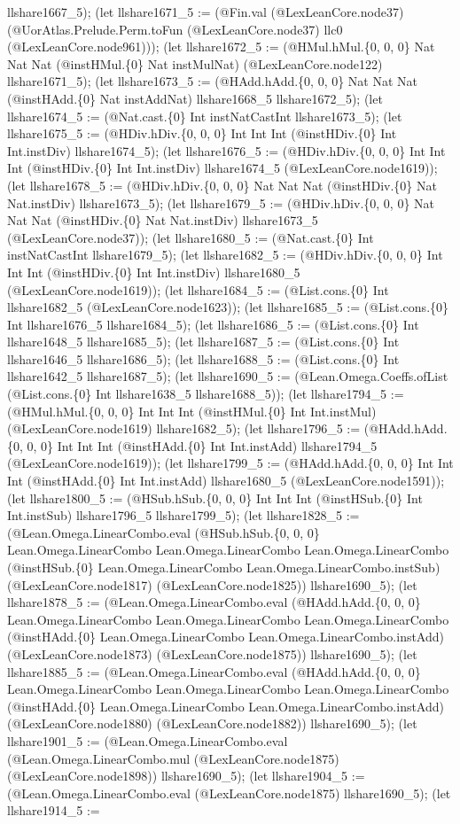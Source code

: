 \documentclass[11pt]{article}
\begin{document}
llshare1667\_5); (let llshare1671\_5 := (@Fin.val (@LexLeanCore.node37) (@UorAtlas.Prelude.Perm.toFun (@LexLeanCore.node37) llc0 (@LexLeanCore.node961))); (let llshare1672\_5 := (@HMul.hMul.\{0, 0, 0\} Nat Nat Nat (@instHMul.\{0\} Nat instMulNat) (@LexLeanCore.node122) llshare1671\_5); (let llshare1673\_5 := (@HAdd.hAdd.\{0, 0, 0\} Nat Nat Nat (@instHAdd.\{0\} Nat instAddNat) llshare1668\_5 llshare1672\_5); (let llshare1674\_5 := (@Nat.cast.\{0\} Int instNatCastInt llshare1673\_5); (let llshare1675\_5 := (@HDiv.hDiv.\{0, 0, 0\} Int Int Int (@instHDiv.\{0\} Int Int.instDiv) llshare1674\_5); (let llshare1676\_5 := (@HDiv.hDiv.\{0, 0, 0\} Int Int Int (@instHDiv.\{0\} Int Int.instDiv) llshare1674\_5 (@LexLeanCore.node1619)); (let llshare1678\_5 := (@HDiv.hDiv.\{0, 0, 0\} Nat Nat Nat (@instHDiv.\{0\} Nat Nat.instDiv) llshare1673\_5); (let llshare1679\_5 := (@HDiv.hDiv.\{0, 0, 0\} Nat Nat Nat (@instHDiv.\{0\} Nat Nat.instDiv) llshare1673\_5 (@LexLeanCore.node37)); (let llshare1680\_5 := (@Nat.cast.\{0\} Int instNatCastInt llshare1679\_5); (let llshare1682\_5 := (@HDiv.hDiv.\{0, 0, 0\} Int Int Int (@instHDiv.\{0\} Int Int.instDiv) llshare1680\_5 (@LexLeanCore.node1619)); (let llshare1684\_5 := (@List.cons.\{0\} Int llshare1682\_5 (@LexLeanCore.node1623)); (let llshare1685\_5 := (@List.cons.\{0\} Int llshare1676\_5 llshare1684\_5); (let llshare1686\_5 := (@List.cons.\{0\} Int llshare1648\_5 llshare1685\_5); (let llshare1687\_5 := (@List.cons.\{0\} Int llshare1646\_5 llshare1686\_5); (let llshare1688\_5 := (@List.cons.\{0\} Int llshare1642\_5 llshare1687\_5); (let llshare1690\_5 := (@Lean.Omega.Coeffs.ofList (@List.cons.\{0\} Int llshare1638\_5 llshare1688\_5)); (let llshare1794\_5 := (@HMul.hMul.\{0, 0, 0\} Int Int Int (@instHMul.\{0\} Int Int.instMul) (@LexLeanCore.node1619) llshare1682\_5); (let llshare1796\_5 := (@HAdd.hAdd.\{0, 0, 0\} Int Int Int (@instHAdd.\{0\} Int Int.instAdd) llshare1794\_5 (@LexLeanCore.node1619)); (let llshare1799\_5 := (@HAdd.hAdd.\{0, 0, 0\} Int Int Int (@instHAdd.\{0\} Int Int.instAdd) llshare1680\_5 (@LexLeanCore.node1591)); (let llshare1800\_5 := (@HSub.hSub.\{0, 0, 0\} Int Int Int (@instHSub.\{0\} Int Int.instSub) llshare1796\_5 llshare1799\_5); (let llshare1828\_5 := (@Lean.Omega.LinearCombo.eval (@HSub.hSub.\{0, 0, 0\} Lean.Omega.LinearCombo Lean.Omega.LinearCombo Lean.Omega.LinearCombo (@instHSub.\{0\} Lean.Omega.LinearCombo Lean.Omega.LinearCombo.instSub) (@LexLeanCore.node1817) (@LexLeanCore.node1825)) llshare1690\_5); (let llshare1878\_5 := (@Lean.Omega.LinearCombo.eval (@HAdd.hAdd.\{0, 0, 0\} Lean.Omega.LinearCombo Lean.Omega.LinearCombo Lean.Omega.LinearCombo (@instHAdd.\{0\} Lean.Omega.LinearCombo Lean.Omega.LinearCombo.instAdd) (@LexLeanCore.node1873) (@LexLeanCore.node1875)) llshare1690\_5); (let llshare1885\_5 := (@Lean.Omega.LinearCombo.eval (@HAdd.hAdd.\{0, 0, 0\} Lean.Omega.LinearCombo Lean.Omega.LinearCombo Lean.Omega.LinearCombo (@instHAdd.\{0\} Lean.Omega.LinearCombo Lean.Omega.LinearCombo.instAdd) (@LexLeanCore.node1880) (@LexLeanCore.node1882)) llshare1690\_5); (let llshare1901\_5 := (@Lean.Omega.LinearCombo.eval (@Lean.Omega.LinearCombo.mul (@LexLeanCore.node1875) (@LexLeanCore.node1898)) llshare1690\_5); (let llshare1904\_5 := (@Lean.Omega.LinearCombo.eval (@LexLeanCore.node1875) llshare1690\_5); (let llshare1914\_5 := 
\end{document}
